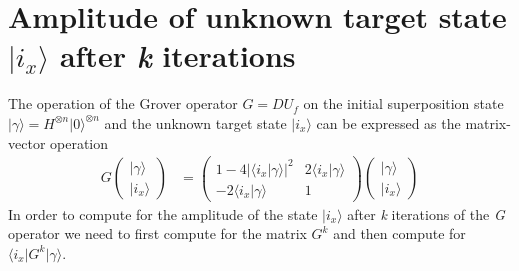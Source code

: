 \chapter{Amplitude of unknown target state $\vert i_x \rangle$ after \textit{k} iterations}\label{app:amplitude}
The operation of the Grover operator $G=DU_f$ on the initial superposition state $\vert \gamma \rangle = H^{\otimes n} \vert 0 \rangle^{\otimes n}$ and the unknown target state $\vert i_x \rangle$ can be expressed as the matrix-vector operation
\begin{align}
G
\begin{pmatrix}
\vert \gamma \rangle\\
\vert i_{x} \rangle
\end{pmatrix}
&=
\begin{pmatrix}
1-4\left\vert\langle i_{x} \vert \gamma \rangle\right\vert^{2} & 2\langle i_{x} \vert \gamma \rangle\\
-2\langle i_{x} \vert \gamma \rangle & 1
\end{pmatrix}
\begin{pmatrix}
\vert \gamma \rangle\\
\vert i_{x} \rangle
\end{pmatrix}
\end{align}
In order to compute for the amplitude of the state $\vert i_x \rangle$ after \textit{k} iterations of the \textit{G} operator we need to first compute for the matrix $G^k$ and then compute for $\langle i_x \vert G^k \vert \gamma \rangle$.

